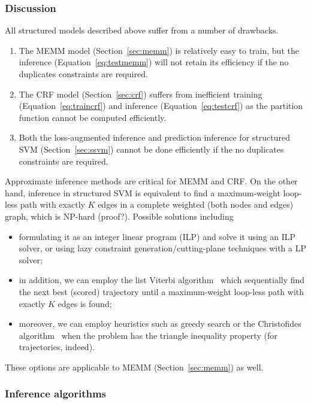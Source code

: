\subsubsection{Discussion}

All structured models described above suffer from a number of drawbacks.
\begin{enumerate}
\item The MEMM model (Section~\ref{sec:memm}) is relatively easy to train, 
      but the inference (Equation~\ref{eq:testmemm}) will not retain its efficiency if the no duplicates constraints are required.
\item The CRF model (Section~\ref{sec:crf}) suffers from inefficient training (Equation~\ref{eq:traincrf}) and 
      inference (Equation~\ref{eq:testcrf}) as the partition function cannot be computed efficiently.
\item Both the loss-augmented inference and prediction inference for structured SVM (Section~\ref{sec:ssvm}) cannot be done efficiently 
      if the no duplicates constraints are required.
\end{enumerate}

Approximate inference methods are critical for MEMM and CRF.
On the other hand, inference in structured SVM is equivalent to 
find a maximum-weight loop-less path with exactly $K$ edges in a complete weighted (both nodes and edges) graph, which is NP-hard (proof?).
Possible solutions including 
\begin{itemize}
\item formulating it as an integer linear program (ILP) and solve it using an ILP solver, 
      or using lazy constraint generation/cutting-plane techniques with a LP solver;
\item in addition, we can employ the list Viterbi algorithm~\cite{nilsson2001sequentially,seshadri1994list} 
      which sequentially find the next best (scored) trajectory until a maximum-weight loop-less path with exactly $K$ edges is found;
\item moreover, we can employ heuristics such as greedy search or the Christofides algorithm~\cite{christofides1976} 
      when the problem has the triangle inequality property (for trajectories, indeed).
\end{itemize}
These options are applicable to MEMM (Section~\ref{sec:memm}) as well.



\subsubsection{Inference algorithms}
\label{sec:inference}

